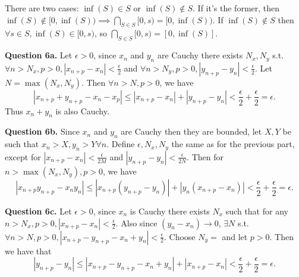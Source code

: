 \documentclass[letterpaper, reqno,11pt]{article}
\begin{document}
There are two cases: $\inf(S)\in S$ or $\inf(S)\notin S$. If it's the former, then $\inf(S)\notin [0,\inf(S))\implies \bigcap_{S\in S}[0,s)=[0,\inf(S))$. If $\inf(S)\notin S$ then $\forall s\in S, \inf(S)\in [0,s)$, so $\bigcap_{S\in S}[0,s)=[0,\inf(S)]$.

\newpage\phantom{blabla}
\newpage

{\medskip\noindent\bf Question 6a.} Let $\epsilon>0$, since $x_n$ and $y_n$ are Cauchy there exists $N_x,N_y$ s.t. $\forall n>N_x, p>0, |x_{n+p}-x_n|< \frac{\epsilon}{2}$ and $\forall n>N_y, p>0, |y_{n+p}-y_n|< \frac{\epsilon}{2}$. Let $N=\max(N_x,N_y)$. Then $\forall n>N, p>0$, we have
\[
\left| x_{n+p}+y_{n+p}-x_n-x_p \right|\leq \left| x_{n+p}-x_n \right| +\left| y_{n+p}-y_n \right| <\frac{\epsilon}{2}+\frac{\epsilon}{2}=\epsilon
.\]
Thus $x_n+y_n$ is also Cauchy.

{\medskip\noindent\bf Question 6b.} Since $x_n$ and $y_n$ are Cauchy then they are bounded, let $X,Y$ be such that $x_n>X,y_n>Y\forall n$. Define $\epsilon,N_x,N_y$ the same as for the previous part, except for $|x_{n+p}-x_n|<\frac{\epsilon}{2M}$ and $|y_{n+p}-y_n|<\frac{\epsilon}{2N}$. Then for $n>\max(N_x,N_y),p>0$, we have
\[
\left| x_{n+p}y_{n+p}-x_ny_n \right| \leq \left| x_{n+p}(y_{n+p}-y_n) \right| +\left| y_n\left( x_{n+p}-x_n \right)  \right| < \frac{\epsilon}{2}+\frac{\epsilon}{2}=\epsilon
.\]

{\medskip\noindent\bf Question 6c.} Let $\epsilon>0$, since $x_n$ is Cauchy there exists $N_x$ such that for any $n>N_x, p>0, |x_{n+p}-x_n|<\frac{\epsilon}{2}$. Also since $(y_n-x_n)\to 0$, $\exists N$ s.t. $\forall n>N,p>0,|x_{n+p}-y_{n+p}-x_{n}+y_{n}|<\frac{\epsilon}{2}$. Choose $N_y=$ and let $p>0$. Then we have that
\[
\left| y_{n+p}-y_n \right| \leq |x_{n+p}-y_{n+p}-x_{n}+y_{n}| + \left| x_{n+p}-x_{n} \right|<\frac{\epsilon}{2}+\frac{\epsilon}{2}=\epsilon
.\]

\newpage\phantom{blabla}
\newpage
\end{document}
